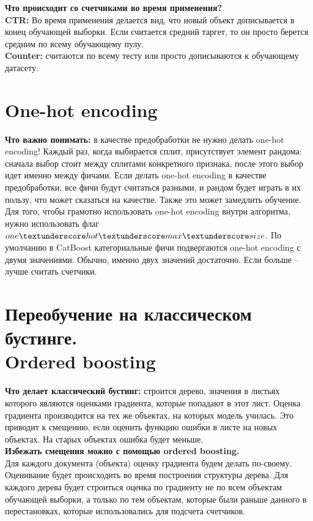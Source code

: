 \documentclass[a4paper,12pt]{article}
\begin{document}
\textbf{Что происходит со счетчиками во время применения?} \\

\textbf{CTR:} Во время применения делается вид, что новый объект дописывается в конец обучающей выборки. Если считается средний таргет, то он просто берется средним по всему обучающему пулу. \\
\textbf{Counter:} считаются по всему тесту или просто дописываются к обучающему датасету.


\section{One-hot encoding}

\textbf{Что важно понимать:} в качестве предобработки не нужно делать one-hot encoding! 
Каждый раз, когда выбирается сплит, присутствует элемент рандома: сначала выбор стоит между сплитами конкретного признака, после этого выбор идет именно между фичами. Если делать one-hot encoding в качестве предобработки, все фичи будут считаться разными, и рандом будет играть в их пользу, что может сказаться на качестве. Также это может замедлить обучение. \\

Для того, чтобы грамотно использовать one-hot encoding внутри алгоритма, нужно использовать флаг $one\textunderscore hot \textunderscore max \textunderscore size$. По умолчанию в CatBoost категориальные фичи подвергаются one-hot encoding с двумя значениями. Обычно, именно двух значений достаточно. Если больше – лучше считать счетчики. 

\section {Переобучение на классическом бустинге. \\ Ordered boosting}

\textbf{Что делает классический бустинг:} строится дерево, значения в листьях которого являются оценками градиента, которые попадают в этот лист. Оценка градиента производится на тех же объектах, на которых модель училась. Это приводит к смещению, если оценить функцию ошибки в листе на новых объектах. На старых объектах ошибка будет меньше. \\

\textbf{Избежать смещения можно с помощью ordered boosting.} \\

Для каждого документа (объекта) оценку градиента будем делать по-своему. Оценивание будет происходить во время построения структуры дерева. Для каждого дерева будет строиться оценка по градиенту не по всем объектам обучающей выборки, а только по тем объектам, которые были раньше данного в перестановках, которые использовались для подсчета счетчиков. \\
\end{document}
